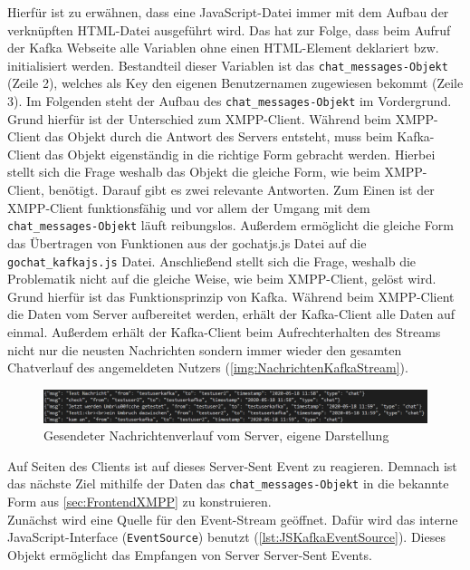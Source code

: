 \documentclass[a4paper,titlepage,halfparskip,12pt]{scrreprt}
\begin{document}
\begin{onehalfspacing}
Hierfür ist zu erwähnen, dass eine JavaScript-Datei immer mit dem Aufbau der verknüpften HTML-Datei ausgeführt wird. Das hat zur Folge, dass beim Aufruf der Kafka Webseite alle Variablen ohne einen HTML-Element deklariert bzw. initialisiert werden. Bestandteil dieser Variablen ist das \texttt{chat\_messages-Objekt} (Zeile 2), welches als Key den eigenen Benutzernamen zugewiesen bekommt (Zeile 3). Im Folgenden steht der Aufbau des \texttt{chat\_messages-Objekt} im Vordergrund. Grund hierfür ist der Unterschied zum XMPP-Client. Während beim XMPP-Client das Objekt durch die Antwort des Servers entsteht, muss beim Kafka-Client das Objekt eigenständig in die richtige Form gebracht werden. Hierbei stellt sich die Frage weshalb das Objekt die gleiche Form, wie beim XMPP-Client, benötigt. Darauf gibt es zwei relevante Antworten. Zum Einen ist der XMPP-Client funktionsfähig und vor allem der Umgang mit dem \texttt{chat\_messages-Objekt} läuft reibungslos. Außerdem ermöglicht die gleiche Form das Übertragen von Funktionen aus der gochatjs.js Datei auf die \texttt{gochat\_kafkajs.js} Datei. Anschließend stellt sich die Frage, weshalb die Problematik nicht auf die gleiche Weise, wie beim XMPP-Client, gelöst wird. Grund hierfür ist das Funktionsprinzip von Kafka. Während beim XMPP-Client die Daten vom Server aufbereitet werden, erhält der Kafka-Client alle Daten auf einmal. Außerdem erhält der Kafka-Client beim Aufrechterhalten des Streams nicht nur die neusten Nachrichten sondern immer wieder den gesamten Chatverlauf des angemeldeten Nutzers (\autoref{img:NachrichtenKafkaStream}).
\begin{figure}[h]
	\centering
	\includegraphics[width=\linewidth]{images/NachrichtenKafkaStream}
	\caption{Gesendeter Nachrichtenverlauf vom Server, eigene Darstellung}
	\label{img:NachrichtenKafkaStream}
\end{figure}
Auf Seiten des Clients ist auf dieses Server-Sent Event zu reagieren. Demnach ist das nächste Ziel mithilfe der Daten das \texttt{chat\_messages-Objekt} in die bekannte Form aus \autoref{sec:FrontendXMPP} zu konstruieren.\\
Zunächst wird eine Quelle für den Event-Stream geöffnet. Dafür wird das interne JavaScript-Interface (\texttt{EventSource}) benutzt (\autoref{lst:JSKafkaEventSource}). Dieses Objekt ermöglicht das Empfangen von Server Server-Sent Events.
\begin{lstlisting}[language=Javascript,caption=Erstellen des Objektes mit dem entsprechenden Endpunkt ,label={lst:JSKafkaEventSource}]

\end{lstlisting}
\end{onehalfspacing}
\end{document}
